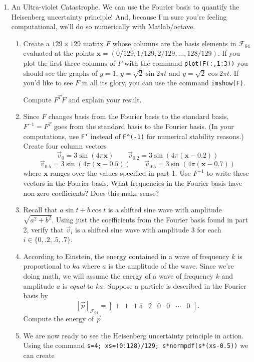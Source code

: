 \documentclass[letter]{article}
\newcommand{\mat}[1]{\begin{bmatrix}#1\end{bmatrix}}
\begin{document}
\begin{enumerate}
		\item {\sc An Ultra-violet Catastrophe}.  We can use the Fourier basis to quantify the Heisenberg uncertainty
			principle!  And, because I'm sure you're feeling computational, we'll do so numerically with Matlab/octave.
			\begin{enumerate}
				\item Create a $129\times 129$ matrix $F$ whose columns are the basis elements in $\mathcal F_{64}$
					evaluated at the points $\mathbf x=(0/129,1/129,2/129,\ldots,128/129)$.  If you plot the first three columns of
					$F$ with the command {\tt plot(F(:,1:3))} you should see the graphs of $y=1$, $y=\sqrt{2}\sin 2\pi t$
					and $y=\sqrt{2}\cos 2\pi t$.  If you'd like to see $F$ in all its glory, you can use
					the command {\tt imshow(F)}.

					Compute $F^TF$ and explain your result.
				\item Since $F$ changes basis from the Fourier basis to the standard basis, $F^{-1}=F^T$ goes
					from the standard basis to the Fourier basis.  (In your computations, use {\tt F'} instead of
					{\tt F\textasciicircum(-1)} for numerical stability reasons.)  Create four column vectors
					\[
					\vec v_0=3\sin(4\pi \mathbf x)\qquad \vec v_{0.2}=3\sin(4\pi (\mathbf x-0.2))\]\[
						\vec v_{0.5}=3\sin(4\pi (\mathbf x-0.5))\qquad\vec v_{0.5}=3\sin(4\pi (\mathbf x-0.7))
					\]
					where $\mathbf x$ ranges over the values specified in part 1.  Use $F^{-1}$ to write
					these vectors in the Fourier basis.  What frequencies in the Fourier basis have non-zero coefficients?
					Does this make sense?
				\item Recall that $a\sin t+b\cos t$ is a shifted sine wave with amplitude $\sqrt{a^2+b^2}$.  Using just the 
					coefficients from the Fourier basis found in part 2, verify that $\vec v_i$ is a shifted sine wave
					with amplitude 3 for each $i\in\{0,.2,.5,.7\}$.
				\item According to Einstein, the energy contained in a wave of frequency $k$ is proportional to $ka$
					where $a$ is the amplitude of the wave.
					Since we're doing math, we will assume the energy of a wave of frequency $k$ and amplitude $a$
					is \emph{equal} to $ka$.  Suppose a particle is described in the Fourier basis by
					\[
						[\vec p]_{\mathcal F_{64}}=\mat{1&1&1.5&2&0&0&\cdots & 0}.
					\]
					Compute the energy of $\vec p$.
				\item We are now ready to see the Heisenberg uncertainty principle in action.  Using
					the command {\tt s=4; xs=(0:128)/129; s*normpdf(s*(xs-0.5))} we can create

\end{enumerate}
\end{enumerate}
\end{document}
